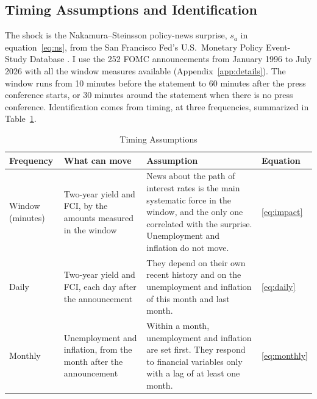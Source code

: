 \documentclass[11pt]{article}
\begin{document}
\subsection{Timing Assumptions and Identification}\label{sec:timing}
The shock is the Nakamura--Steinsson policy-news surprise, $s_a$ in equation~\eqref{eq:ns}, from the San Francisco Fed's U.S.\ Monetary Policy Event-Study Database \citep{acosta2025}. I use the 252 FOMC announcements from January 1996 to July 2026 with all the window measures available (Appendix~\ref{app:details}). The window runs from 10 minutes before the statement to 60 minutes after the press conference starts, or 30 minutes around the statement when there is no press conference. Identification comes from timing, at three frequencies, summarized in Table~\ref{tab:timing}.

\begin{table}[tp]\centering\small
\caption{Timing Assumptions}\label{tab:timing}
\begin{tabular}{p{}p{}p{}p{}}\toprule
Frequency & What can move & Assumption & Equation \\\midrule
Window (minutes) & Two-year yield and FCI, by the amounts measured in the window & News about the path of interest rates is the main systematic force in the window, and the only one correlated with the surprise. Unemployment and inflation do not move. & \eqref{eq:impact} \\[3pt]
Daily & Two-year yield and FCI, each day after the announcement & They depend on their own recent history and on the unemployment and inflation of this month and last month. & \eqref{eq:daily} \\[3pt]
Monthly & Unemployment and inflation, from the month after the announcement & Within a month, unemployment and inflation are set first. They respond to financial variables only with a lag of at least one month. & \eqref{eq:monthly} \\\bottomrule
\end{tabular}
\end{table}
\end{document}
